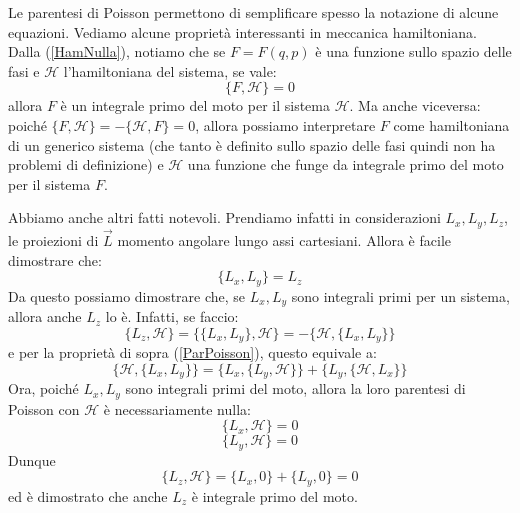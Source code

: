 \documentclass[a4paper,openany]{article}
\begin{document}
Le parentesi di Poisson permettono di semplificare spesso la notazione di alcune equazioni. Vediamo alcune  proprietà interessanti in meccanica hamiltoniana. Dalla (\ref{HamNulla}), notiamo che se $F=F(q,p)$ è una funzione sullo spazio delle fasi e $\mathcal{H}$ l'hamiltoniana del sistema, se vale:
\begin{equation}\label{key}
	\{F,\mathcal{H}\} = 0
\end{equation}
allora $F$ è un integrale primo del moto per il sistema $\mathcal{H}$. Ma anche viceversa: poiché $\{F,\mathcal{H}\} = -\{\mathcal{H},F\} = 0$, allora possiamo interpretare $F$ come hamiltoniana di un generico sistema (che tanto è definito sullo spazio delle fasi quindi non ha problemi di definizione) e $\mathcal{H}$ una funzione che funge da integrale primo del moto per il sistema $F$.

Abbiamo anche altri fatti notevoli. Prendiamo infatti in considerazioni $L_x,L_y,L_z$, le proiezioni di $\vec{
L}$ momento angolare lungo assi cartesiani. Allora è facile dimostrare che:
\begin{equation}\label{key}
	\{L_x,L_y\} = L_z 
\end{equation}
Da questo possiamo dimostrare che, se $L_x, L_y$ sono integrali primi per un sistema, allora anche $L_z$ lo è. Infatti, se faccio:
\begin{equation}\label{key}
	\{L_z, \mathcal{H}\} = \{\{L_x,L_y\},\mathcal{H}\} = -\{\mathcal{H},\{L_x,L_y\}\}
\end{equation}
e per la proprietà di sopra (\ref{ParPoisson}), questo equivale a:
\begin{equation}\label{key}
	\{\mathcal{H},\{L_x,L_y\}\} = \{L_x,\{L_y,\mathcal{H}\}\} + \{L_y,\{\mathcal{H},L_x\}\}
\end{equation}
Ora, poiché $L_x, L_y$ sono integrali primi del moto, allora la loro parentesi di Poisson con $\mathcal{H}$ è necessariamente nulla:
$$
\{L_x,\mathcal{H}\} = 0
$$
$$
\{L_y,\mathcal{H}\} = 0
$$
Dunque
\begin{equation}\label{key}
	\{L_z, \mathcal{H}\} = \{L_x,0\} + \{L_y,0\} = 0
\end{equation}
ed è dimostrato che anche $L_z$ è integrale primo del moto.
\end{document}
